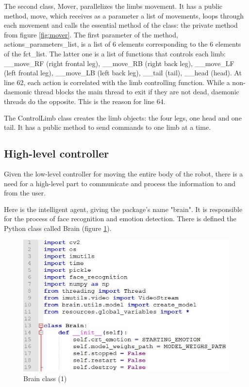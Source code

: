 \documentclass[runningheads,a4paper,12pt]{report}
\begin{document}
The second class, Mover, parallelizes the limbs movement. It has a public method, move, which receives as a parameter a list of movements, loops through each movement and calls the essential method of the class: the private method from figure \ref{fig:mover}. The first parameter of the method, actions\_parameters\_list, is a list of 6 elements corresponding to the 6 elements of the fct\_list. The latter one is a list of functions that controls each limb: \_\_move\_RF (right frontal leg), \_\_move\_RB (right back leg), \_\_move\_LF (left frontal leg), \_\_move\_LB (left back leg), \_\_tail (tail), \_\_head (head). At line 62, each action is correlated with the limb controlling function. While a non-daemonic thread blocks the main thread to exit if they are not dead, daemonic threads do the opposite. This is the reason for line 64. 

The ControlLimb class creates the limb objects: the four legs, one head and one tail. It has a public method to send commands to one limb at a time.   

\subsection*{High-level controller}
Given the low-level controller for moving the entire body of the robot, there is a need for a high-level part to communicate and process the information to and from the user. 

Here is the intelligent agent, giving the package's name "brain". It is responsible for the process of face recognition and emotion detection. There is defined the Python class called Brain (figure \ref{fig:3_brain1}).

\begin{figure}[h]
	\centering
	\includegraphics[width=0.7\linewidth]{./images/3_brain1}\hfill	
	\caption{Brain class (1)}  
    \label{fig:3_brain1}
\end{figure}
\end{document}
